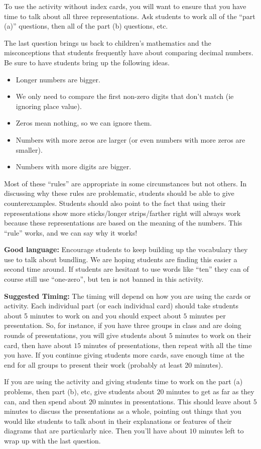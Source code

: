 \documentclass[nooutcomes,noauthor,handout]{ximera}
\begin{document}
\begin{instructorNotes}
To use the activity without index cards, you will want to ensure that you have time to talk about all three representations. Ask students to work all of the ``part (a)'' questions, then all of the part (b) questions, etc.

The last question brings us back to children's mathematics and the misconceptions that students frequently have about comparing decimal numbers. Be sure to have students bring up the following ideas.
\begin{itemize}
	\item Longer numbers are bigger.
	\item We only need to compare the first non-zero digits that don't match (ie ignoring place value).
	\item Zeros mean nothing, so we can ignore them.
	\item Numbers with more zeros are larger (or even numbers with more zeros are smaller).
	\item Numbers with more digits are bigger.
\end{itemize}
Most of these ``rules'' are appropriate in some circumstances but not others. In discussing why these rules are problematic, students should be able to give counterexamples. Students should also point to the fact that using their representations show more sticks/longer strips/farther right will always work because these representations are based on the meaning of the numbers. This ``rule'' works, and we can say why it works!

{\bf Good language:} Encourage students to keep building up the vocabulary they use to talk about bundling. We are hoping students are finding this easier a second time around. If students are hesitant to use words like ``ten'' they can of course still use ``one-zero'', but ten is not banned in this activity.

{\bf Suggested Timing:} The timing will depend on how you are using the cards or activity. Each individual part (or each individual card) should take students about 5 minutes to work on and you should expect about $5$ minutes per presentation. So, for instance, if you have three groups in class and are doing rounds of presentations, you will give students about $5$ minutes to work on their card, then have about $15$ minutes of presentations, then repeat with all the time you have. If you continue giving students more cards, save enough time at the end for all groups to present their work (probably at least 20 minutes).

If you are using the activity and giving students time to work on the part (a) problems, then part (b), etc, give students about $20$ minutes to get as far as they can, and then spend about $20$ minutes in presentations. This should leave about $5$ minutes to discuss the presentations as a whole, pointing out things that you would like students to talk about in their explanations or features of their diagrams that are particularly nice. Then you'll have about $10$ minutes left to wrap up with the last question.


\end{instructorNotes}
\end{document}
